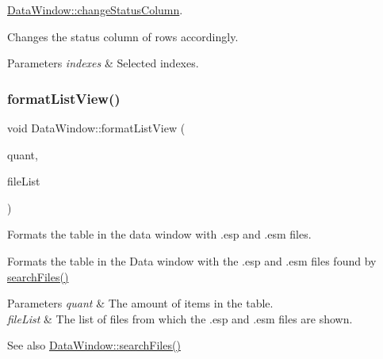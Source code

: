 \hyperlink{class_data_window_ace296e3143e2ab4db036b53bf6b969db}{Data\+Window\+::change\+Status\+Column}. 

Changes the status column of rows accordingly. 
\begin{DoxyParams}{Parameters}
{\em indexes} & Selected indexes. \\
\hline
\end{DoxyParams}
\mbox{\label{class_data_window_ae3d109b65fb7dfe89f182f26a71bcc44}} 
\subsubsection{\texorpdfstring{format\+List\+View()}{formatListView()}}
{\footnotesize\ttfamily void Data\+Window\+::format\+List\+View (\begin{DoxyParamCaption}\item[{int}]{quant,  }\item[{Q\+String\+List}]{file\+List }\end{DoxyParamCaption})\hspace{0.3cm}{\ttfamily [private]}}



Formats the table in the data window with .esp and .esm files. 

Formats the table in the Data window with the .esp and .esm files found by \hyperlink{class_data_window_a688deef3093506b8d7889c19c3b3c65a}{search\+Files()} 
\begin{DoxyParams}{Parameters}
{\em quant} & The amount of items in the table. \\
\hline
{\em file\+List} & The list of files from which the .esp and .esm files are shown. \\
\hline
\end{DoxyParams}
\begin{DoxySeeAlso}{See also}
\hyperlink{class_data_window_a688deef3093506b8d7889c19c3b3c65a}{Data\+Window\+::search\+Files()} 
\end{DoxySeeAlso}
\mbox{\label{class_data_window_ad87fafdcacd55f6edf71b61bcafc2a2d}} 
